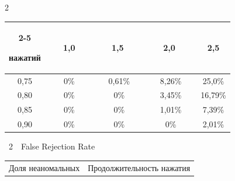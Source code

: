 \begin{multicols}{2}
\begin{center}
{\begin{tabular}{|c|c|c|c|c|}
         \cline{2-5}

 нажатий& \ \ \ 1,0\ \ \  & \ \ \ 1,5 \ \ \  & \ \ \ 2,0 \ \ \   & 2,5     \\

                \hline

                0,75 & 0\% & 0,61\% & 8,26\% & 25,0\%\hphantom{9}  \\


                    0,80 & 0\% & 0\%\hphantom{9,9}    & 3,45\% & 16,79\% \\


                0,85 & 0\% & 0\%\hphantom{9,9}    & 1,01\% & \hphantom{9}7,39\%  \\


                0,90 & 0\% & 0\%\hphantom{9,9}    & 0\%\hphantom{,99}    & \hphantom{9}2,01\%  \\

                                \hline

                \end{tabular}





}



\vspace*{6pt}



{{\tablename~2}\ \ \small{False Rejection Rate}}



\vspace*{6pt}

        




 

{\small                \tabcolsep=1.5pt

                \begin{tabular}{|c|c|c|c|c|}

                               \hline

        Доля неаномальных   &\multicolumn{4}{c|}{ Продолжительность нажатия}\\


\end{tabular}}
\end{center}
\end{multicols}
